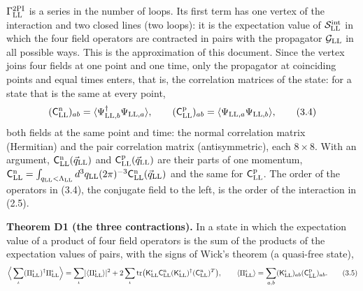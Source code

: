 \documentclass[
  10pt,
]{article}
\begin{document}
\(\Gamma^{\rm 2PI}_{\rm LL}\) is a series in the number of loops. Its
first term has one vertex of the interaction and two closed lines (two
loops): it is the expectation value of \(\mathcal S^{\rm int}_{\rm LL}\)
in which the four field operators are contracted in pairs with the
propagator \(\mathcal G_{\rm LL}\) in all possible ways. This is the
approximation of this document. Since the vertex joins four fields at
one point and one time, only the propagator at coinciding points and
equal times enters, that is, the correlation matrices of the state: for
a state that is the same at every point,
\[(\mathsf C^{\rm n}_{\rm LL})_{ab}=\langle\Psi^\dagger_{{\rm LL},b}\Psi_{{\rm LL},a}\rangle,\qquad
(\mathsf C^{\rm p}_{\rm LL})_{ab}=\langle\Psi_{{\rm LL},a}\Psi_{{\rm LL},b}\rangle,\tag{3.4}\]
both fields at the same point and time: the normal correlation matrix
(Hermitian) and the pair correlation matrix (antisymmetric), each
\(8\times8\). With an argument,
\(\mathsf C^{\rm n}_{\rm LL}(\vec q_{\rm LL})\) and
\(\mathsf C^{\rm p}_{\rm LL}(\vec q_{\rm LL})\) are their parts of one
momentum,
\(\mathsf C^{\rm n}_{\rm LL}=\int_{q_{\rm LL}<\Lambda_{\rm LL}}d^3q_{\rm LL}(2\pi)^{-3}\mathsf C^{\rm n}_{\rm LL}(\vec q_{\rm LL})\)
and the same for \(\mathsf C^{\rm p}_{\rm LL}\). The order of the
operators in (3.4), the conjugate field to the left, is the order of the
interaction in (2.5).

\textbf{Theorem D1 (the three contractions).} In a state in which the
expectation value of a product of four field operators is the sum of the
products of the expectation values of pairs, with the signs of Wick's
theorem (a quasi-free state),
\[\Big\langle\sum_\iota(\Pi^\iota_{\rm LL})^\dagger\Pi^\iota_{\rm LL}\Big\rangle
=\sum_\iota\lvert\langle\Pi^\iota_{\rm LL}\rangle\rvert^2
+2\sum_\iota\mathrm{tr}\big(\mathsf K^\iota_{\rm LL}\mathsf C^{\rm n}_{\rm LL}(\mathsf K^\iota_{\rm LL})^\dagger(\mathsf C^{\rm n}_{\rm LL})^T\big),
\qquad\langle\Pi^\iota_{\rm LL}\rangle=\sum_{a,b}(\mathsf K^\iota_{\rm LL})_{ab}(\mathsf C^{\rm p}_{\rm LL})_{ab}.\tag{3.5}\]
\end{document}
